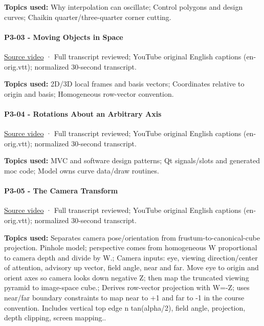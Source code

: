 \textbf{Topics used:} Why interpolation can oscillate; Control polygons and design curves; Chaikin quarter/three-quarter corner cutting.

\paragraph{P3-03 - Moving Objects in Space}\label{p3-03---moving-objects-in-space}

\href{https://www.youtube.com/watch?v=wArGifkRD2A}{Source video} · Full transcript reviewed; YouTube original English captions (en-orig.vtt); normalized 30-second transcript.

\textbf{Topics used:} 2D/3D local frames and basis vectors; Coordinates relative to origin and basis; Homogeneous row-vector convention.

\paragraph{P3-04 - Rotations About an Arbitrary Axis}\label{p3-04---rotations-about-an-arbitrary-axis}

\href{https://www.youtube.com/watch?v=gRVxv8kWl0Q}{Source video} · Full transcript reviewed; YouTube original English captions (en-orig.vtt); normalized 30-second transcript.

\textbf{Topics used:} MVC and software design patterns; Qt signals/slots and generated moc code; Model owns curve data/draw routines.

\paragraph{P3-05 - The Camera Transform}\label{p3-05---the-camera-transform}

\href{https://www.youtube.com/watch?v=mpTl003EXCY}{Source video} · Full transcript reviewed; YouTube original English captions (en-orig.vtt); normalized 30-second transcript.

\textbf{Topics used:} Separates camera pose/orientation from frustum-to-canonical-cube projection. Pinhole model; perspective comes from homogeneous W proportional to camera depth and divide by W.; Camera inputs: eye, viewing direction/center of attention, advisory up vector, field angle, near and far. Move eye to origin and orient axes so camera looks down negative Z; then map the truncated viewing pyramid to image-space cube.; Derives row-vector projection with W=-Z; uses near/far boundary constraints to map near to +1 and far to -1 in the course convention. Includes vertical top edge n tan(alpha/2), field angle, projection, depth clipping, screen mapping..

